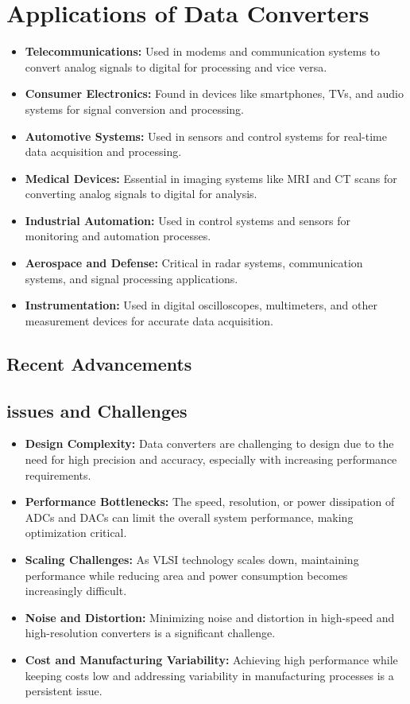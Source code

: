 \section{Applications of Data Converters}
\begin{itemize}
    \item \textbf{Telecommunications:} Used in modems and communication systems to convert analog signals to digital for processing and vice versa.
    \item \textbf{Consumer Electronics:} Found in devices like smartphones, TVs, and audio systems for signal conversion and processing.
    \item \textbf{Automotive Systems:} Used in sensors and control systems for real-time data acquisition and processing.
    \item \textbf{Medical Devices:} Essential in imaging systems like MRI and CT scans for converting analog signals to digital for analysis.
    \item \textbf{Industrial Automation:} Used in control systems and sensors for monitoring and automation processes.
    \item \textbf{Aerospace and Defense:} Critical in radar systems, communication systems, and signal processing applications.
    \item \textbf{Instrumentation:} Used in digital oscilloscopes, multimeters, and other measurement devices for accurate data acquisition.
\end{itemize}

\subsection{Recent Advancements}


\subsection{issues and Challenges}
\begin{itemize}
    \item \textbf{Design Complexity:} Data converters are challenging to design due to the need for high precision and accuracy, especially with increasing performance requirements.
    \item \textbf{Performance Bottlenecks:} The speed, resolution, or power dissipation of ADCs and DACs can limit the overall system performance, making optimization critical.
    \item \textbf{Scaling Challenges:} As VLSI technology scales down, maintaining performance while reducing area and power consumption becomes increasingly difficult.
    \item \textbf{Noise and Distortion:} Minimizing noise and distortion in high-speed and high-resolution converters is a significant challenge.
    \item \textbf{Cost and Manufacturing Variability:} Achieving high performance while keeping costs low and addressing variability in manufacturing processes is a persistent issue.
\end{itemize}
